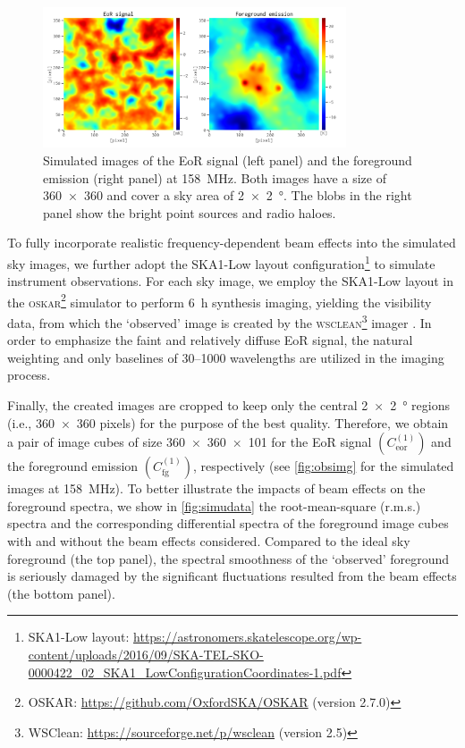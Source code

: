 \documentclass[fleqn,usenatbib]{mnras}
\newcommand{\R}[1]{\mathrm{#1}}
\newcommand{\editwip}[1]{{\leavevmode\color{magenta}#1}}
\begin{document}
{\begin{figure}
  \centering
  \includegraphics[width=0.8\textwidth]{obsimg-158}
  \caption{\label{fig:obsimg}\editwip{%
    Simulated images of the EoR signal (left panel) and the foreground
    emission (right panel) at \SI{158}{\MHz}.
    Both images have a size of \num{360 x 360} and cover a sky area of
    \SI{2 x 2}{\degree}.
    The blobs in the right panel show the bright point sources and radio
    haloes.
  }}
\end{figure}

To fully incorporate realistic frequency-dependent beam effects into the
simulated sky images, we further adopt the SKA1-Low layout
configuration\footnote{\raggedright%
  SKA1-Low layout:
  \url{https://astronomers.skatelescope.org/wp-content/uploads/2016/09/SKA-TEL-SKO-0000422_02_SKA1_LowConfigurationCoordinates-1.pdf}}
to simulate instrument observations.
For each sky image, we employ the SKA1-Low layout in the
\textsc{oskar}\footnote{%
  OSKAR: \url{https://github.com/OxfordSKA/OSKAR} (version 2.7.0)}
simulator \citep{mort2010} to perform \SI{6}{\hour} synthesis imaging,
yielding the visibility data, from which the `observed'
image is created by the \textsc{wsclean}\footnote{%
  WSClean: \url{https://sourceforge.net/p/wsclean} (version 2.5)}
imager \citep{offringa2014}.
In order to emphasize the faint and relatively diffuse EoR signal, the
natural weighting and only baselines of \numrange{30}{1000} wavelengths are
utilized in the imaging process.} %
Finally, the created images are cropped to keep only the central
\SI{2 x 2}{\degree} regions (i.e., \num{360 x 360} pixels) for the
purpose of the best quality.
Therefore, we obtain \editwip{a pair of} image cubes of size
\num{360 x 360 x 101} for the EoR signal $\left( C_{\R{eor}}^{(1)} \right)$
and the foreground emission $\left( C_{\R{fg}}^{(1)} \right)$, respectively
\editwip{%
(see \autoref{fig:obsimg} for the simulated images at \SI{158}{\MHz}).
To better illustrate the impacts of beam effects on the foreground spectra,
we show in \autoref{fig:simudata} the root-mean-square (r.m.s\@.) spectra
and the corresponding differential spectra of the foreground image cubes
with and without the beam effects considered.
Compared to the ideal sky foreground (the top panel), the spectral
smoothness of the `observed' foreground is seriously damaged by the
significant fluctuations resulted from the beam effects (the bottom panel).
} %
\end{document}
